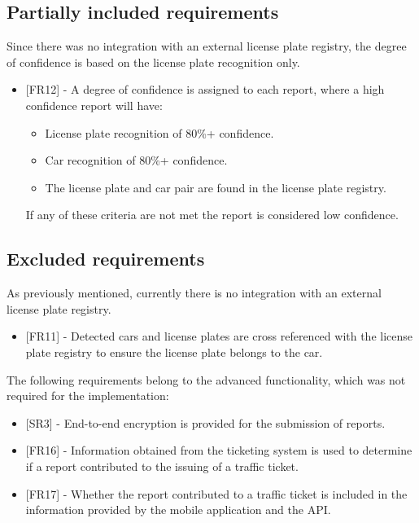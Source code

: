 \subsection{Partially included requirements}
Since there was no integration with an external license plate registry, the degree of confidence is based on the license plate recognition only.

\begin{itemize}[label={}]

            \item {[FR12]} - A degree of confidence is assigned to each report, where a high confidence report will have:
                \begin{itemize}[label={\textbullet}]
                    \item License plate recognition of 80\%+ confidence.
                    \item Car recognition of 80\%+ confidence.
                    \item The license plate and car pair are found in the license plate registry.
                \end{itemize}
            If any of these criteria are not met the report is considered low confidence.

\end{itemize}

\subsection{Excluded requirements}
As previously mentioned, currently there is no integration with an external license plate registry.
\begin{itemize}[label={}]
    \item {[FR11]} - Detected cars and license plates are cross referenced with the license plate registry to ensure the license plate belongs to the car.
\end{itemize}

The following requirements belong to the advanced functionality, which was not required for the implementation:

\begin{itemize}[label={}]
            \item {[SR3]} - End-to-end encryption is provided for the submission of reports. 
            \item {[FR16]} - Information obtained from the ticketing system is used to determine if a report contributed to the issuing of a traffic ticket.
            \item {[FR17]} - Whether the report contributed to a traffic ticket is included in the information provided by the mobile application and the API.
\end{itemize}